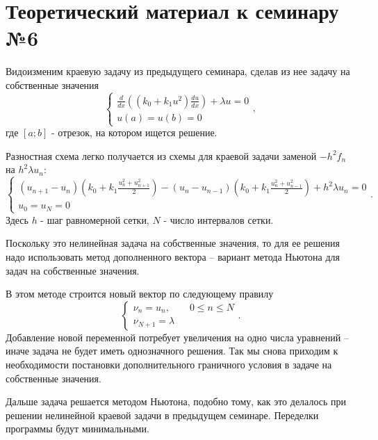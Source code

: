 \section{Теоретический материал к семинару №6}
Видоизменим краевую задачу из предыдущего семинара, сделав из нее задачу на собственные значения
\begin{equation} \label{c6eq1}
	\begin{cases}
		 \displaystyle \frac{d}{dx} \left( \left( k_0 + k_1 u^2 \right) \frac{du}{dx} \right) + \lambda u = 0 \\
		u(a) = u(b) = 0
	\end{cases},
\end{equation}
где $[a; b]$ - отрезок, на котором ищется решение.

Разностная схема легко получается из схемы для краевой задачи заменой $-h^2 f_n$ на $h^2 \lambda u_n$:
\begin{equation} \label{c6eq2}
	\begin{cases}
		\displaystyle \left( u_{n+1} - u_n \right) \left( k_0 + k_1 \frac{u_n^2 + u_{n+1}^2}{2} \right) - \left( u_n - u_{n-1} \right) \left( k_0 + k_1 \frac{u_n^2 + u_{n-1}^2}{2} \right) + h^2 \lambda u_n = 0 \\
		u_0 = u_N = 0
	\end{cases}.
\end{equation}
Здесь $h$ - шаг равномерной сетки, $N$ - число интервалов сетки.

Поскольку это нелинейная задача на собственные значения, то для ее решения надо использовать метод дополненного вектора – вариант метода Ньютона для задач на собственные значения.

В этом методе строится новый вектор   по следующему правилу
\begin{equation} \label{c6eq3}
	\begin{cases}
	\nu_n = u_n, \qquad 0 \leq n \leq N\\
	\nu_{N+1} = \lambda
	\end{cases}.
\end{equation}
Добавление новой переменной потребует увеличения на одно числа уравнений – иначе задача не будет иметь однозначного решения. Так мы снова приходим к необходимости постановки дополнительного граничного условия в задаче на собственные значения.

Дальше задача решается методом Ньютона, подобно тому, как это делалось при решении нелинейной краевой задачи в предыдущем семинаре. Переделки программы будут минимальными.

